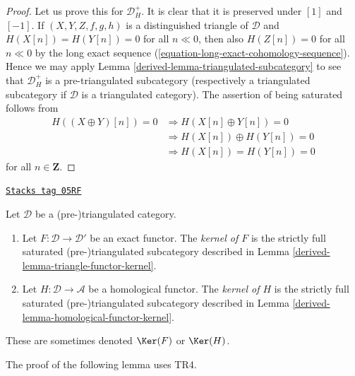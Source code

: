 \begin{proof}

Let us prove this for $\mathcal{D}_H^{+}$.
It is clear that it is preserved under $[1]$ and $[-1]$.
If $(X, Y, Z, f, g, h)$ is a distinguished triangle of $\mathcal{D}$
and $H(X[n]) = H(Y[n]) = 0$ for all $n \ll 0$, then also $H(Z[n]) = 0$
for all $n \ll 0$ by the long exact sequence
(\ref{equation-long-exact-cohomology-sequence}).
Hence we may apply
Lemma \ref{derived-lemma-triangulated-subcategory}
to see that $\mathcal{D}_H^{+}$ is a pre-triangulated subcategory
(respectively a triangulated subcategory if $\mathcal{D}$ is a
triangulated category). The assertion of being saturated follows from
\begin{align*}
H((X \oplus Y)[n]) = 0 & \Rightarrow H(X[n] \oplus Y[n]) = 0 \\
& \Rightarrow H(X[n]) \oplus H(Y[n]) = 0 \\
& \Rightarrow H(X[n]) = H(Y[n]) = 0
\end{align*}
for all $n \in \mathbf{Z}$.
\end{proof}

\begin{definition}
\label{derived-definition-kernel-category}
\href{https://stacks.math.columbia.edu/tag/05RF}{\texttt{Stacks tag 05RF}}

Let $\mathcal{D}$ be a (pre-)triangulated category.
\begin{enumerate}
\item Let $F : \mathcal{D} \to \mathcal{D}'$ be an exact functor.
The {\it kernel of $F$} is the strictly full saturated
(pre-)triangulated subcategory described in
Lemma \ref{derived-lemma-triangle-functor-kernel}.
\item Let $H : \mathcal{D} \to \mathcal{A}$ be a homological functor.
The {\it kernel of $H$} is the strictly full saturated
(pre-)triangulated subcategory described in
Lemma \ref{derived-lemma-homological-functor-kernel}.
\end{enumerate}
These are sometimes denoted $\Ker(F)$ or $\Ker(H)$.
\end{definition}

The proof of the following lemma uses TR4.

